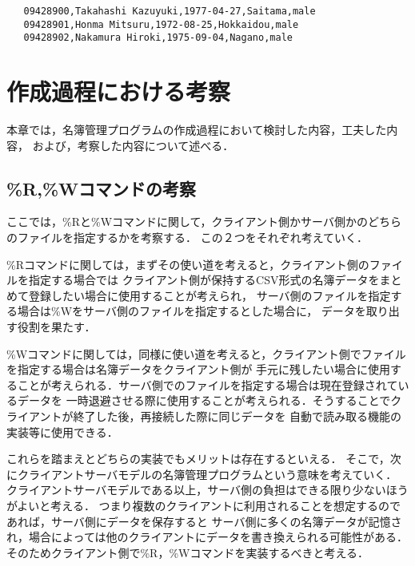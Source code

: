 \documentclass[a4paper,11pt]{jarticle}
\begin{document}
{\fontsize{10pt}{11pt} \selectfont
 \begin{verbatim}
   09428900,Takahashi Kazuyuki,1977-04-27,Saitama,male
   09428901,Honma Mitsuru,1972-08-25,Hokkaidou,male
   09428902,Nakamura Hiroki,1975-09-04,Nagano,male
  \end{verbatim}
}
\noindent


\section{作成過程における考察}
本章では，名簿管理プログラムの作成過程において検討した内容，工夫した内容，
および，考察した内容について述べる．

\subsection{\%R,\%Wコマンドの考察}
ここでは，\%Rと\%Wコマンドに関して，クライアント側かサーバ側かのどちらのファイルを指定するかを考察する．
この２つをそれぞれ考えていく．

\%Rコマンドに関しては，まずその使い道を考えると，クライアント側のファイルを指定する場合では
クライアント側が保持するCSV形式の名簿データをまとめて登録したい場合に使用することが考えられ，
サーバ側のファイルを指定する場合は\%Wをサーバ側のファイルを指定するとした場合に，
データを取り出す役割を果たす．

\%Wコマンドに関しては，同様に使い道を考えると，クライアント側でファイルを指定する場合は名簿データをクライアント側が
手元に残したい場合に使用することが考えられる．サーバ側でのファイルを指定する場合は現在登録されているデータを
一時退避させる際に使用することが考えられる．そうすることでクライアントが終了した後，再接続した際に同じデータを
自動で読み取る機能の実装等に使用できる．

これらを踏まえとどちらの実装でもメリットは存在するといえる．
そこで，次にクライアントサーバモデルの名簿管理プログラムという意味を考えていく．
クライアントサーバモデルである以上，サーバ側の負担はできる限り少ないほうがよいと考える．
つまり複数のクライアントに利用されることを想定するのであれば，サーバ側にデータを保存すると
サーバ側に多くの名簿データが記憶され，場合によっては他のクライアントにデータを書き換えられる可能性がある．
そのためクライアント側で\%R，\%Wコマンドを実装するべきと考える．
\end{document}

